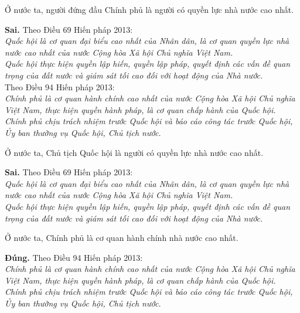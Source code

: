 \begin{ques}
Ở nước ta, người đứng đầu Chính phủ là người có quyền lực nhà nước cao nhất.
\end{ques}
\begin{ans}
\textbf{Sai.} Theo Điều 69 Hiến pháp 2013:\\
\textit{Quốc hội là cơ quan đại biểu cao nhất của Nhân dân, là cơ quan quyền lực nhà nước cao nhất của nước Cộng hòa Xã hội Chủ nghĩa Việt Nam.}\\
\textit{Quốc hội thực hiện quyền lập hiến, quyền lập pháp, quyết định các vấn đề quan trọng của đất nước và giám sát tối cao đối với hoạt động của Nhà nước.}\\
Theo Điều 94 Hiến pháp 2013:\\
\textit{Chính phủ là cơ quan hành chính cao nhất của nước Cộng hòa Xã hội Chủ nghĩa Việt Nam, thực hiện quyền hành pháp, là cơ quan chấp hành của Quốc hội.}\\
\textit{Chính phủ chịu trách nhiệm trước Quốc hội và báo cáo công tác trước Quốc hội, Ủy ban thường vụ Quốc hội, Chủ tịch nước.}
\end{ans}

\begin{ques}
Ở nước ta, Chủ tịch Quốc hội là người có quyền lực nhà nước cao nhất.
\end{ques}
\begin{ans}
\textbf{Sai.} Theo Điều 69 Hiến pháp 2013:\\
\textit{Quốc hội là cơ quan đại biểu cao nhất của Nhân dân, là cơ quan quyền lực nhà nước cao nhất của nước Cộng hòa Xã hội Chủ nghĩa Việt Nam.}\\
\textit{Quốc hội thực hiện quyền lập hiến, quyền lập pháp, quyết định các vấn đề quan trọng của đất nước và giám sát tối cao đối với hoạt động của Nhà nước.}
\end{ans}

\begin{ques}
Ở nước ta, Chính phủ là cơ quan hành chính nhà nước cao nhất.
\end{ques}
\begin{ans}
\textbf{Đúng.} Theo Điều 94 Hiến pháp 2013:\\
\textit{Chính phủ là cơ quan hành chính cao nhất của nước Cộng hòa Xã hội Chủ nghĩa Việt Nam, thực hiện quyền hành pháp, là cơ quan chấp hành của Quốc hội.}\\
\textit{Chính phủ chịu trách nhiệm trước Quốc hội và báo cáo công tác trước Quốc hội, Ủy ban thường vụ Quốc hội, Chủ tịch nước.}
\end{ans}

